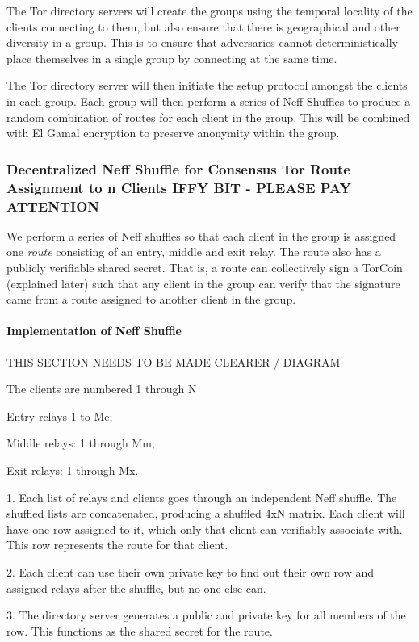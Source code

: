 The Tor directory servers will create the groups using the temporal locality of the clients connecting to them, but also ensure that there is geographical and other diversity in a group. This is to ensure that adversaries cannot deterministically place themselves in a single group by connecting at the same time.

The Tor directory server will then initiate the setup protocol amongst the clients in each group. Each group will then perform a series of Neff Shuffles to produce a random combination of routes for each client in the group. This will be combined with El Gamal encryption to preserve anonymity within the group.

\subsubsection{Decentralized Neff Shuffle for Consensus Tor Route Assignment to n Clients IFFY BIT - PLEASE PAY ATTENTION}
We perform a series of Neff shuffles so that each client in the group is assigned one \textit{route} consisting of an entry, middle and exit relay. The route also has a publicly verifiable shared secret. That is, a route can collectively sign a TorCoin (explained later) such that any client in the group can verify that the signature came from a route assigned to another client in the group.

\paragraph{Implementation of Neff Shuffle}

THIS SECTION NEEDS TO BE MADE CLEARER / DIAGRAM

The clients are numbered 1 through N

Entry relays 1 to Me; 

Middle relays: 1 through Mm; 

Exit relays: 1 through Mx.

1.  Each list of relays and clients goes through an independent Neff shuffle. The shuffled lists are concatenated, producing a shuffled 4xN matrix. Each client will have one row assigned to it, which only that client can verifiably associate with. This row represents the route for that client.

2.  Each client can use their own private key to find out their own row and assigned relays after the shuffle, but no one else can.

3.  The directory server generates a public and private key for all members of the row. This functions as the shared secret for the route.

